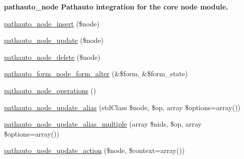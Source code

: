 \begin{Indent}{\bf pathauto\_\-node Pathauto integration for the core node module.}\par
{\em \label{_amgrp5e1d5010550667237fc9f0f2423d47fb}
 }\begin{DoxyCompactItemize}
\item 
\hyperlink{pathauto_8module_add29f7fab0e1fed4b1f6f7611822c94f}{pathauto\_\-node\_\-insert} (\$node)
\item 
\hyperlink{pathauto_8module_ae9e518cbd22ab87a5ab49500f095123b}{pathauto\_\-node\_\-update} (\$node)
\item 
\hyperlink{pathauto_8module_ab1416f7c389afd71659c4a6faed9b92c}{pathauto\_\-node\_\-delete} (\$node)
\item 
\hyperlink{pathauto_8module_acfdd05981fd465c6ed43d0670b02990b}{pathauto\_\-form\_\-node\_\-form\_\-alter} (\&\$form, \&\$form\_\-state)
\item 
\hyperlink{pathauto_8module_a141f6c04361a1572bb0c02681de7f22f}{pathauto\_\-node\_\-operations} ()
\item 
\hyperlink{pathauto_8module_a7b5113607e03d0f1d12207d737545bcf}{pathauto\_\-node\_\-update\_\-alias} (stdClass \$node, \$op, array \$options=array())
\item 
\hyperlink{pathauto_8module_adc92cb455997bd4a2e6504b40951cdff}{pathauto\_\-node\_\-update\_\-alias\_\-multiple} (array \$nids, \$op, array \$options=array())
\item 
\hyperlink{pathauto_8module_abe86e5924ea06f972dd7c6de8b57c7f1}{pathauto\_\-node\_\-update\_\-action} (\$node, \$context=array())
\end{DoxyCompactItemize}
\end{Indent}
